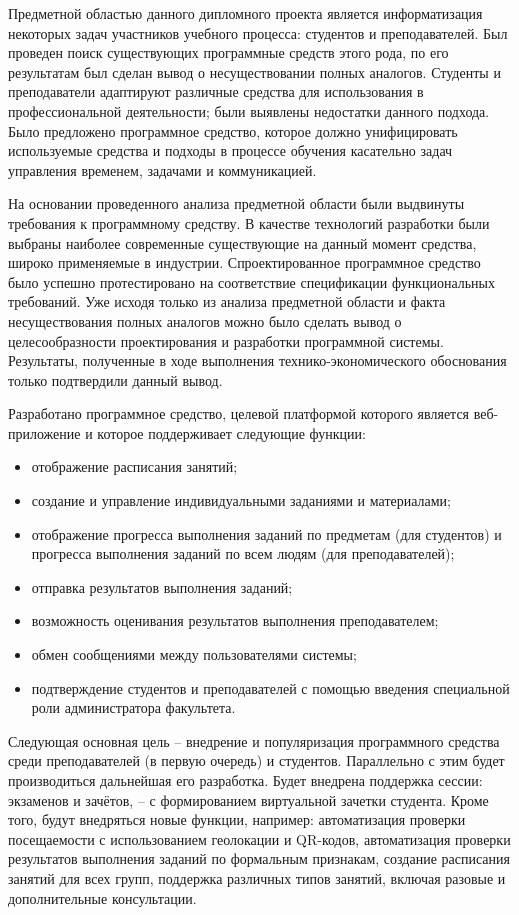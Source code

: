 
Предметной областью данного дипломного проекта является информатизация некоторых задач участников учебного процесса: студентов и преподавателей. Был проведен поиск существующих программные средств этого рода, по его результатам был сделан вывод о несуществовании полных аналогов. Студенты и преподаватели адаптируют различные средства для использования в профессиональной деятельности; были выявлены недостатки данного подхода. Было предложено программное средство, которое должно унифицировать используемые средства и подходы в процессе обучения касательно задач управления временем, задачами и коммуникацией. 

На основании проведенного анализа предметной области были выдвинуты требования к программному средству. В качестве технологий разработки были выбраны наиболее современные существующие на данный момент средства, широко применяемые в индустрии. Спроектированное программное средство было успешно протестировано на соответствие спецификации функциональных требований. Уже исходя только из анализа предметной области и факта несуществования полных аналогов можно было сделать вывод о целесообразности проектирования и разработки программной системы. Результаты, полученные в ходе выполнения технико-экономического обоснования только подтвердили данный вывод.

Разработано программное средство, целевой платформой которого является веб-приложение и которое поддерживает следующие функции:
\begin{itemize}
	\item отображение расписания занятий;
	\item создание и управление индивидуальными заданиями и материалами;
	\item отображение прогресса выполнения заданий по предметам (для студентов) и прогресса выполнения заданий по всем людям (для преподавателей);
	\item отправка результатов выполнения заданий;
	\item возможность оценивания результатов выполнения преподавателем;
	\item обмен сообщениями между пользователями системы;
	\item подтверждение студентов и преподавателей с помощью введения специальной роли администратора факультета.
\end{itemize}

Следующая основная цель -- внедрение и популяризация программного средства среди преподавателей (в первую очередь) и студентов. Параллельно с этим будет производиться дальнейшая его разработка. Будет внедрена поддержка сессии: экзаменов и зачётов, -- с формированием виртуальной зачетки студента. Кроме того, будут внедряться новые функции, например: автоматизация проверки посещаемости с использованием геолокации и QR-кодов, автоматизация проверки результатов выполнения заданий по формальным признакам, создание расписания занятий для всех групп, поддержка различных типов занятий, включая разовые и дополнительные консультации.